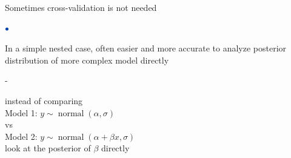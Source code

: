 \documentclass[english,t]{beamer}
\DeclareMathOperator{\normal}{normal}
\newenvironment{list1}{
   \begin{list}{$\color{list1}\bullet$}{\itemsep=6pt}}{
  \end{list}}
\newenvironment{list2}{
  \begin{list}{-}{\baselineskip=12pt\itemsep=2pt}}{
  \end{list}}
\begin{document}
\begin{frame}{Sometimes cross-validation is not needed}

\begin{list1}
\item<+-> In a simple nested case, often easier and more accurate to
  analyze posterior distribution of more complex model directly
  \begin{list2}
  \item instead of comparing\\
    \vspace{0.2\baselineskip}
    Model 1: $y \sim \normal(\alpha, \sigma)$\\
    \vspace{0.2\baselineskip}
    vs\\
    \vspace{0.2\baselineskip}
    Model 2: $y \sim \normal(\alpha + \beta x, \sigma)$\\
    \vspace{0.2\baselineskip}
    look at the posterior of $\beta$ directly
  \end{list2}
\end{list1}

\end{frame}
\end{document}
